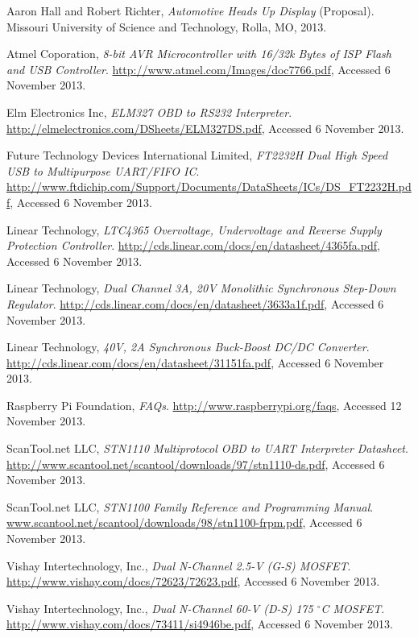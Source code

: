 \begin{thebibliography}{99}

	Aaron Hall and Robert Richter,
	\emph{Automotive Heads Up Display} (Proposal).
	Missouri University of Science and Technology,
	Rolla, MO,
	2013.

	Atmel Coporation,
	\emph{8-bit AVR Microcontroller with 16/32k Bytes of ISP Flash and USB Controller}.
	\url{http://www.atmel.com/Images/doc7766.pdf},
	Accessed 6 November 2013.

	Elm Electronics Inc,
	\emph{ELM327 OBD to RS232 Interpreter}.
	\url{http://elmelectronics.com/DSheets/ELM327DS.pdf},
	Accessed 6 November 2013.

	Future Technology Devices International Limited,
	\emph{FT2232H Dual High Speed USB to Multipurpose UART/FIFO IC}.
	\url{http://www.ftdichip.com/Support/Documents/DataSheets/ICs/DS_FT2232H.pdf},
	Accessed 6 November 2013.

	Linear Technology,
	\emph{LTC4365 Overvoltage, Undervoltage and Reverse Supply Protection Controller}.
	\url{http://cds.linear.com/docs/en/datasheet/4365fa.pdf},
	Accessed 6 November 2013.

	Linear Technology,
	\emph{Dual Channel 3A, 20V Monolithic Synchronous Step-Down Regulator}.
	\url{http://cds.linear.com/docs/en/datasheet/3633a1f.pdf},
	Accessed 6 November 2013.

	Linear Technology,
	\emph{40V, 2A Synchronous Buck-Boost DC/DC Converter}.
	\url{http://cds.linear.com/docs/en/datasheet/31151fa.pdf},
	Accessed 6 November 2013.

	Raspberry Pi Foundation,
	\emph{FAQs}.
	\url{http://www.raspberrypi.org/faqs},
	Accessed 12 November 2013.

	ScanTool.net LLC,
	\emph{STN1110 Multiprotocol OBD to UART Interpreter Datasheet}.
	\url{http://www.scantool.net/scantool/downloads/97/stn1110-ds.pdf},
	Accessed 6 November 2013.

	ScanTool.net LLC,
	\emph{STN1100 Family Reference and Programming Manual}.
	\url{www.scantool.net/scantool/downloads/98/stn1100-frpm.pdf‎},
	Accessed 6 November 2013.

	Vishay Intertechnology, Inc.,
	\emph{Dual N-Channel 2.5-V (G-S) MOSFET}.
	\url{http://www.vishay.com/docs/72623/72623.pdf},
	Accessed 6 November 2013.

	Vishay Intertechnology, Inc.,
	\emph{Dual N-Channel 60-V (D-S) 175 $^\circ$C MOSFET}.
	\url{http://www.vishay.com/docs/73411/si4946be.pdf},
	Accessed 6 November 2013.

\end{thebibliography}
